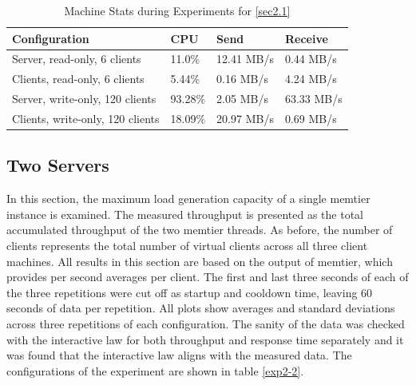 \documentclass[11pt,a4paper]{article}
\begin{document}
\begin{center}
    \begin{table}
    	\begin{tabular}{|l|p{2cm}|p{2cm}|p{2cm}|}
            \hline \textbf{Configuration} & \textbf{CPU} & \textbf{Send} & \textbf{Receive}\\
            \hline Server, read-only, 6 clients & 11.0\%         & 12.41 MB/s    & 0.44 MB/s\\
            \hline Clients, read-only, 6 clients & 5.44\%           & 0.16 MB/s     & 4.24 MB/s\\
            \hline Server, write-only,  120 clients & 93.28\%        & 2.05 MB/s     & 63.33 MB/s\\
            \hline Clients, write-only, 120 clients & 18.09\%       & 20.97 MB/s     & 0.69 MB/s\\
            \hline
    	\end{tabular}
	\caption{Machine Stats during Experiments for \autoref{sec2.1}}
    \label{dstat:2-1}
	\end{table}
\end{center}

\subsection{Two Servers} \label{sec2.2}
In this section, the maximum load generation capacity of a single memtier instance is examined. The measured throughput is presented as the total accumulated throughput of the two memtier threads. As before, the number of clients represents the total number of virtual clients across all three client machines. All results in this section are based on the output of memtier, which provides per second averages per client. The first and last three seconds of each of the three repetitions were cut off as startup and cooldown time, leaving 60 seconds of data per repetition. All plots show averages and standard deviations across three repetitions of each configuration. The sanity of the data was checked with the interactive law for both throughput and response time separately and it was found that the interactive law aligns with the measured data. The configurations of the experiment are shown in table \autoref{exp2-2}.
\end{document}
